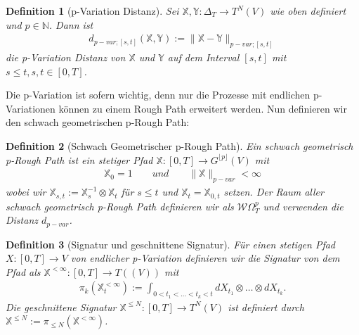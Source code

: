 \documentclass[12pt,titlepage,headsepline]{article}
\newtheorem{definition}{Definition}[section]
\begin{document}
      \begin{definition}[p-Variation Distanz]
        Sei $\mathbb{X}, \mathbb{Y} : \Delta_T \rightarrow T^N(V)$ wie oben definiert und $p \in \mathbb{N}$. Dann ist
        \begin{align*}
          d_{p-var;[s,t]}(\mathbb{X},\mathbb{Y}):=\lVert \mathbb{X} - \mathbb{Y} \rVert_{p-var;[s,t]}
        \end{align*}
        die p-Variation Distanz von $\mathbb{X}$ und $\mathbb{Y}$ auf dem Interval $[s,t]$ mit $s \leq t, s,t \in [0,T]$.
      \end{definition}

      \hfill\break
      Die p-Variation ist sofern wichtig, denn nur die Prozesse mit endlichen p-Variationen können zu einem Rough Path erweitert werden.\cite{lyons_extension_2007}
      \hfill\break
      Nun definieren wir den schwach geometrischen p-Rough Path:
      \begin{definition}[Schwach Geometrischer p-Rough Path]
        Ein schwach geometrisch p-Rough Path ist ein stetiger Pfad $\mathbb{X}: [0,T] \rightarrow G^{\lfloor p\rfloor}(V)$ mit
        \begin{align*}
          \mathbb{X}_0 = 1
          \qquad und \qquad
          \lVert \mathbb{X} \rVert_{p-var} < \infty
        \end{align*}
        wobei wir $\mathbb{X}_{s,t}:= \mathbb{X}^{-1}_s \otimes \mathbb{X}_t$ für $s \leq t $ und $\mathbb{X}_t=\mathbb{X}_{0,t}$ setzen.
        Der Raum aller schwach geometrisch p-Rough Path definieren wir als $\mathcal{W}\Omega^p_T$ und verwenden die Distanz $d_{p-var}$.
      \end{definition}
      \begin{definition}[Signatur und geschnittene Signatur]
        Für einen stetigen Pfad $X: [0,T] \rightarrow V$ von endlicher p-Variation definieren wir die Signatur von dem Pfad als $\mathbb{X}^{<\infty}:[0,T] \rightarrow T((V))$ mit
        \begin{align*}
          \pi_k(\mathbb{X}^{<\infty}_t):=\int_{0<t_1<\ldots<t_k<t} dX_{t_1}\otimes \ldots \otimes dX_{t_k}.
        \end{align*}
        Die geschnittene Signatur $\mathbb{X}^{\leq N}:[0,T] \rightarrow T^N(V)$ ist definiert durch $\mathbb{X}^{\leq N}:=\pi_{\leq N}(\mathbb{X}^{<\infty})$.
      \end{definition}
\end{document}
